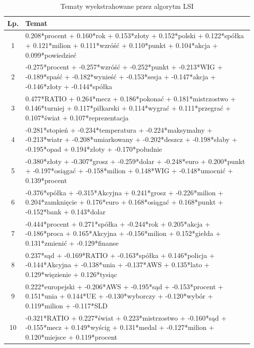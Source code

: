 \documentclass[11pt,a4paper]{article}
\begin{document}
\begin{table}[h]
\caption{Tematy wyekstrahowane przez algorytm LSI}
\label{lsi_topics}
\begin{tabular}{|c|p{\linewidth}|}
\hline
Lp. & Temat \\\hline

1 & 0.208*procent + 0.160*rok + 0.153*złoty + 0.152*polski + 0.122*spółka + 0.121*milion + 0.111*wzróść + 0.110*punkt + 0.104*akcja + 0.099*powiedzieć\\\hline
2 & -0.275*procent + -0.257*wzróść + -0.252*punkt + -0.213*WIG + -0.189*spaść + -0.182*wynieść + -0.153*sesja + -0.147*akcja + -0.146*złoty + -0.144*spółka\\\hline
3 & 0.477*RATIO + 0.264*mecz + 0.186*pokonać + 0.181*mistrzostwo + 0.146*turniej + 0.117*piłkarski + 0.114*wygrać + 0.111*przegrać + 0.107*świat + 0.107*reprezentacja\\\hline
4 & -0.281*stopień + -0.234*temperatura + -0.224*maksymalny + -0.213*wiatr + -0.208*umiarkowany + -0.202*deszcz + -0.198*słaby + -0.195*opad + 0.194*złoty + -0.170*południe\\\hline
5 & -0.380*złoty + -0.307*grosz + -0.259*dolar + -0.248*euro + 0.200*punkt + -0.197*osiągać + -0.158*milion + 0.148*WIG + -0.148*umocnić + 0.139*procent\\\hline
6 & -0.376*spółka + -0.315*Akcyjna + 0.241*grosz + -0.226*milion + 0.204*zamknięcie + 0.176*euro + 0.168*osiągać + 0.168*punkt + -0.152*bank + 0.143*dolar\\\hline
7 & -0.444*procent + 0.271*spółka + -0.244*rok + 0.205*akcja + -0.186*proca + 0.165*Akcyjna + -0.156*milion + 0.152*giełda + 0.131*zmienić + -0.129*finanse\\\hline
8 & 0.237*sąd + -0.169*RATIO + -0.163*spółka + 0.146*policja + -0.144*Akcyjna + -0.138*unia + -0.137*AWS + 0.135*lato + 0.129*więzienie + 0.126*tysiąc\\\hline
9 & 0.222*europejski + -0.206*AWS + -0.195*sąd + -0.153*procent + 0.151*unia + 0.144*UE + -0.130*wyborczy + -0.120*wybór + 0.119*milion + -0.117*SLD\\\hline
10 & -0.321*RATIO + 0.227*świat + 0.223*mistrzostwo + -0.160*sąd + -0.155*mecz + 0.149*wyścig + 0.131*medal + -0.127*milion + 0.120*miejsce + 0.119*procent\\\hline
\end{tabular}
\end{table}
\end{document}
